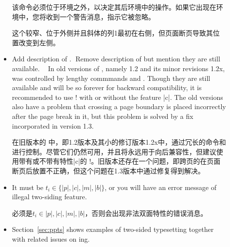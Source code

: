 \begin{description}
\begin{itemize}
该命令必须位于环境之外，以决定其后环境中的操作。如果它出现在环境中，您将收到一个警告消息，指示它被忽略。
\twosided[c]

这个较窄、位于外侧并且斜体的列1最初在右侧，但页面断页导致其位置改变到左侧。
\item
{}
{Add description of .}
{Remove description of  but mention
    they are still available.}

In old versions of \Paracol, namely 1.2 and its minor revisions 1.2x,
\cswap{} was controlled by lengthy commmands
\Midx{\!\swapcolumninevenpages!} and \Midx{\!\noswapcolumninevenpages!}.
Though they are still available and will be so forever for backward
compatibility, it is recommended to use \!\twosided! with or without the
feature |c|.  The old versions also have a problem that \spanning{}
crossing a page boundary is placed incorrectly after the page break in it,
but this problem is solved by a fix incorporated in version 1.3.

在旧版本的 \Paracol 中，即1.2版本及其小的修订版本1.2x中，\cswap{}通过冗长的命令\Midx{\!\swapcolumninevenpages!}和\Midx{\!\noswapcolumninevenpages!}进行控制。尽管它们仍然可用，并且将永远用于向后兼容性，但建议使用带有或不带有特性|c|的 \!\twosided!。旧版本还存在一个问题，即跨页的\spanning{}在页面断页后放置不正确，但这个问题在1.3版本中通过修复得到解决。
\item
It must be $t_i\in\{|p|,|c|,|m|,|b|\}$, or you will have an error message
of illegal two-siding feature.

必须是$t_i\in{|p|,|c|,|m|,|b|}$，否则会出现非法双面特性的错误消息。
\item
Section~\ref{sec:ppts} shows examples of two-sided typesetting together
with related issues on \parapag{}ing.


\end{itemize}
\end{description}
